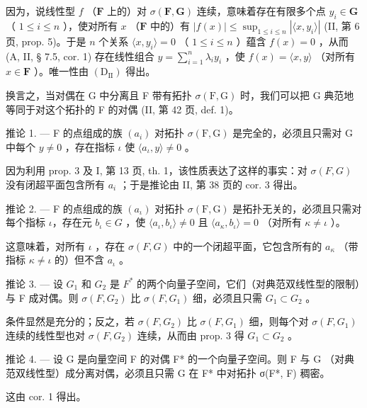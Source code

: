 因为，说线性型 \(f\) （\(\mathbf{F}\) 上的）对 \(\sigma(\mathbf{F}, \mathbf{G})\) 连续，意味着存在有限多个点 \(y_i \in \mathbf{G}\) （ \(1 \leqslant i \leqslant n\) ），使对所有 \(x\) （\(\mathbf{F}\) 中的）有 \(|f(x)| \leqslant \sup_{1 \leqslant i \leqslant n} |\langle x, y_i \rangle|\) (II, 第 6 页, prop. 5)。于是 \(n\) 个关系 \(\langle x, y_i \rangle = 0\) （ \(1 \leqslant i \leqslant n\) ）蕴含 \(f(x) = 0\) ，从而 (A, II, § 7.5, cor. 1) 存在线性组合 \(y = \sum_{i=1}^{n} \lambda_i y_i\) ，使 \(f(x) = \langle x, y \rangle\) （对所有 \(x \in \mathbf{F}\) ）。唯一性由 \((\mathrm{D}_{\mathrm{II}})\) 得出。

换言之，当对偶在 G 中分离且 F 带有拓扑 \(\sigma(\mathrm{F}, \mathrm{G})\) 时，我们可以把 G 典范地等同于对这个拓扑的 F 的对偶 (II, 第 42 页, def. 1)。

推论 1. --- F 的点组成的族 \((a_i)\) 对拓扑 \(\sigma(\mathrm{F},\mathrm{G})\) 是完全的，必须且只需对 G 中每个 \(y \neq 0\) ，存在指标 \(\iota\) 使 \(\langle a_{\iota}, y \rangle \neq 0\) 。

因为利用 prop. 3 及 I, 第 13 页, th. 1，该性质表达了这样的事实：对 \(\sigma(F, G)\) 没有闭超平面包含所有 \(a_{i}\) ；于是推论由 II, 第 38 页的 cor. 3 得出。

推论 2. --- F 的点组成的族 \((a_{\iota})\) 对拓扑 \(\sigma(\mathrm{F}, \mathrm{G})\) 是拓扑无关的，必须且只需对每个指标 \(\iota\)，存在元 \(b_{\iota} \in G\) ，使 \(\langle a_{\iota}, b_{\iota} \rangle \neq 0\) 且 \(\langle a_{\kappa}, b_{\iota} \rangle = 0\) （对所有 \(\kappa \neq \iota\) ）。

这意味着，对所有 \(\iota\) ，存在 \(\sigma(F, G)\) 中的一个闭超平面，它包含所有的 \(a_{\kappa}\) （带指标 \(\kappa \neq \iota\) 的）但不含 \(a_{\iota}\) 。

推论 3. --- 设 \(G_{1}\) 和 \(G_{2}\) 是 \(F^{*}\) 的两个向量子空间，它们（对典范双线性型的限制）与 F 成对偶。则 \(\sigma(F, G_{2})\) 比 \(\sigma(F, G_{1})\) 细，必须且只需 \(G_{1} \subset G_{2}\) 。

条件显然是充分的；反之，若 \(\sigma(F, G_2)\) 比 \(\sigma(F, G_1)\) 细，则每个对 \(\sigma(F, G_1)\) 连续的线性型也对 \(\sigma(F, G_2)\) 连续，从而由 prop. 3 得 \(G_1 \subset G_2\) 。

推论 4. --- 设 G 是向量空间 F 的对偶 F* 的一个向量子空间。则 F 与 G （对典范双线性型）成分离对偶，必须且只需 G 在 F* 中对拓扑 σ(F*, F) 稠密。

这由 cor. 1 得出。

